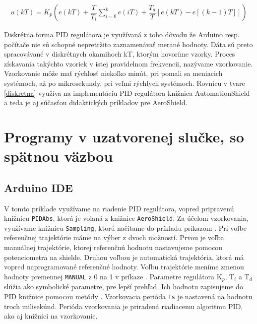 \begin{align}
	\label{diskretna}
	u(kT)=K_p \left(e(kT) + \dfrac{T}{T_i} \sum_{i=0}^{k}  e(iT) + \dfrac{T_d}{T} \left[e(kT)-e \left[(k - 1)T\right] \right] \right)
\end{align}

Diskrétna forma PID regulátora je využívaná z toho dôvodu že Arduino resp. počítače nie sú schopné nepretržito zaznamenávať merané hodnoty. Dáta sú preto spracovávané v diskrétnych okamihoch kT, ktorým hovoríme vzorky. Proces získavania takýchto vzoriek v istej pravidelnom frekvencii, nazývame vzorkovanie. Vzorkovanie môže mať rýchlosť niekoľko minút, pri pomali sa meniacich systémoch, až po mikrosekundy, pri veľmi rýchlych systémoch. Rovnicu v tvare \ref{diskretna} využíva na implementáciu PID regulátora knižnica AutomationShield a teda je aj súčasťou didaktických príkladov pre AeroShield. 

\section{Programy v uzatvorenej slučke, so spätnou väzbou}
\subsection{Arduino IDE}
\label{Arduino IDE PID}

V tomto príklade využívame na riadenie PID regulátora, vopred pripravenú knižnicu \verb|PIDAbs|, ktorá je volaná z knižnice \verb|AeroShield|. Za účelom vzorkovania, využívame knižnicu \verb|Sampling|, ktorú načítame do príkladu príkazom . Pri voľbe referenčnej trajektórie máme na výber z dvoch možností. Prvou je voľba manuálnej trajektórie, ktorej referenčnú hodnotu nastavujeme pomocou potenciometra na shielde. Druhou voľbou je automatická trajektória, ktorá má vopred naprogramované referenčné hodnoty. Voľbu trajektórie meníme zmenou hodnoty premennej \verb|MANUAL| z 0 na 1 v príkaze . Parametre regulátora K$_p$, T$_i$ a T$_d$ slúžia ako symbolické parametre, pre lepší prehľad. Ich hodnotu zapisujeme do PID knižnice pomocou metódy . Vzorkovacia perióda \verb|Ts| je nastavená na hodnotu troch milisekúnd. Perióda vzorkovania je priradená riadiacemu algoritmu PID, ako aj knižnici na vzorkovanie. 

